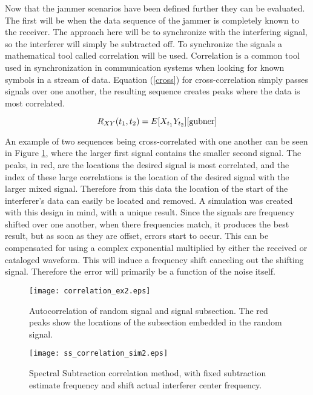Now that the jammer scenarios have been defined further they can be evaluated.  The first will be when the data sequence of the jammer is completely known to the receiver.  The approach here will be to synchronize with the interfering signal, so the interferer will simply be subtracted off.  To synchronize the signals a mathematical tool called correlation will be used.  Correlation is a common tool used in synchronization in communication systems when looking for known symbols in a stream of data.  Equation (\ref{cross}) for cross-correlation simply passes signals over one another, the resulting sequence creates peaks where the data is most correlated.

\begin{equation}\label{cross}
R_{XY}(t_{1},t_{2})=E[X_{t_{1}}Y_{t_{2}}]   \cite{gubner}
\end{equation}

An example of two sequences being cross-correlated with one another can be seen in Figure \ref{ss_correlation_ex}, where the larger first signal contains the smaller second signal. The peaks, in red, are the locations the desired signal is most correlated, and the index of these large correlations is the location of the desired signal with the larger mixed signal.  Therefore from this data the location of the start of the interferer's data can easily be located and removed.  A simulation was created with this design in mind, with a unique result.  Since the signals are frequency shifted over one another, when there frequencies match, it produces the best result, but as soon as they are offset, errors start to occur.  This can be compensated for using a complex exponential multiplied by either the received or cataloged waveform.  This will induce a frequency shift canceling out the shifting signal.  Therefore the error will primarily be a function of the noise itself.\\

\begin{figure}[!ht]
\centering
\texttt{[image: correlation\_ex2.eps]}
\caption{Autocorrelation of random signal and signal subsection.  The red peaks show the locations of the subsection embedded in the random signal.}
\label{ss_correlation_ex}
\end{figure} 

\begin{figure}[!ht]
\centering
\texttt{[image: ss\_correlation\_sim2.eps]}
\caption{Spectral Subtraction correlation method, with fixed subtraction estimate frequency and shift actual interferer center frequency.}
\label{ss_correlation}
\end{figure} 

